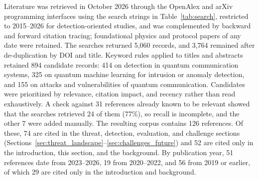 Literature was retrieved in October 2026 through the OpenAlex and arXiv programming interfaces using the search strings in Table~\ref{tab:search}, restricted to 2015--2026 for detection-oriented studies, and was complemented by backward and forward citation tracing; foundational physics and protocol papers of any date were retained. The searches returned 5,060 records, and 3,764 remained after de-duplication by DOI and title. Keyword rules applied to titles and abstracts retained 894 candidate records: 414 on detection in quantum communication systems, 325 on quantum machine learning for intrusion or anomaly detection, and 155 on attacks and vulnerabilities of quantum communication. Candidates were prioritized by relevance, citation impact, and recency rather than read exhaustively. A check against 31 references already known to be relevant showed that the searches retrieved 24 of them (77\%), so recall is incomplete, and the other 7 were added manually. The resulting corpus contains 126 references. Of these, 74 are cited in the threat, detection, evaluation, and challenge sections (Sections~\ref{sec:threat_landscape}--\ref{sec:challenges_future}) and 52 are cited only in the introduction, this section, and the background. By publication year, 51 references date from 2023--2026, 19 from 2020--2022, and 56 from 2019 or earlier, of which 29 are cited only in the introduction and background.

